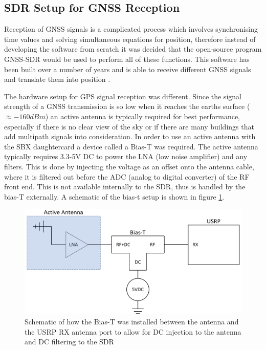 \subsection{SDR Setup for GNSS Reception}
Reception of GNSS signals is a complicated process which involves synchronising time values and solving simultaneous equations for position, therefore instead of
developing the software from scratch it was decided that
the open-source program GNSS-SDR would be used to perform all of these functions. This software has been built over a number of years and is able to receive different GNSS
signals and translate them into position \cite{RN16}.

The hardware setup for GPS signal reception was different. Since the signal strength of a GNSS transmission is so low when it reaches the earths surface ($\approx -160dBm$) an active
antenna is typically required for best performance, especially if there is no clear view of the sky or if there are many buildings that add multipath signals into
consideration. In order to use an active antenna with the SBX daughtercard a device called a Bias-T was required. The active antenna typically requires 3.3-5V DC to
power the LNA (low noise amplifier) and any filters. This is done by injecting the voltage as an offset onto the antenna cable, where it is filtered out before the ADC
(analog to digital converter) of
the RF front end. This is not available internally to the SDR, thus is handled by the bias-T externally. A schematic of the bias-t setup is shown in figure \ref{fig:biasT}.

\begin{figure}[h]
    \begin{centering}
        \includegraphics[width=12cm,keepaspectratio]{Figures/biasT setup.png}
        \caption{Schematic of how the Bias-T was installed between the antenna and the USRP RX antenna port to allow for DC injection to the antenna and DC filtering to the SDR}
        \label{fig:biasT}
    \end{centering}
\end{figure}

